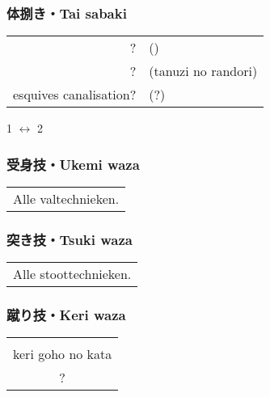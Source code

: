 \subsubsection{体捌き・Tai sabaki}
\begin{table}[H]
\begin{center}
\begin{tabular}{rl}
    ? & (\ruby{}{})\\
    ? & (tanuzi no randori)\\
    esquives canalisation? & (?)
\end{tabular}
\end{center}
\label{kyuu_1_taisabaki}
\end{table}
\begin{center}
    1 $\leftrightarrow$ 2
\end{center}

\subsubsection{受身技・Ukemi waza}
\begin{table}[H]
\begin{center}
\begin{tabular}{c}
    Alle valtechnieken.
\end{tabular}
\end{center}
\label{kyuu_1_ukemi_waza}
\end{table}

\subsubsection{突き技・Tsuki waza}
\begin{table}[H]
\begin{center}
\begin{tabular}{c}
    Alle stoottechnieken.
\end{tabular}
\end{center}
\label{kyuu_1_tsuki_waza}
\end{table}

\subsubsection{蹴り技・Keri waza}
\begin{table}[H]
\begin{center}
\begin{tabular}{c}
    \ruby{}{}\ruby{}{}\\
    keri goho no kata\\
    ?
\end{tabular}
\end{center}
\label{kyuu_1_keri_waza}
\end{table}

